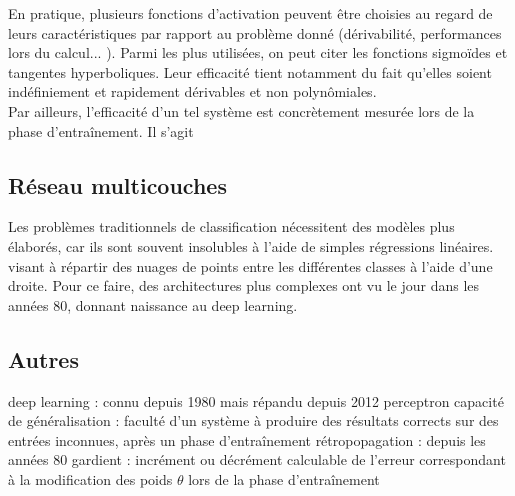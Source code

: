 \documentclass[a4paper,10pt]{report}
\begin{document}
En pratique, plusieurs fonctions d'activation peuvent être choisies au regard de leurs caractéristiques par rapport au problème donné (dérivabilité, performances lors du calcul... ).
Parmi les plus utilisées, on peut citer les fonctions sigmoïdes et tangentes hyperboliques. Leur efficacité tient notamment du fait qu'elles soient indéfiniement et rapidement dérivables et non polynômiales. 
\\

Par ailleurs, l'efficacité d'un tel système est concrètement mesurée lors de la phase d'entraînement. Il s'agit 

\subsection{Réseau multicouches}

Les problèmes traditionnels de classification nécessitent des modèles plus élaborés, car ils sont souvent insolubles à l'aide de simples régressions linéaires. 
visant à répartir des nuages de points entre les différentes classes à l'aide d'une droite.
Pour ce faire, des architectures plus complexes ont vu le jour dans les années 80, donnant naissance au deep learning.



\subsection{Autres}
deep learning : connu depuis 1980 mais répandu depuis 2012
perceptron
capacité de généralisation : faculté d'un système à produire des résultats corrects sur des entrées inconnues, après un phase d'entraînement
rétropopagation : depuis les années 80
gardient : incrément ou décrément calculable de l'erreur correspondant à la modification des poids $\theta$ lors de la phase d'entraînement 
\end{document}
